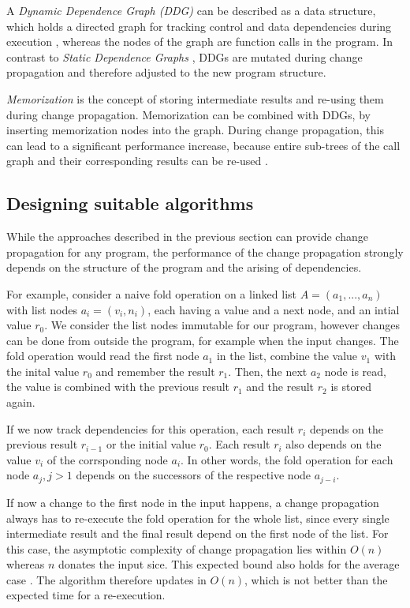 A \textit{Dynamic Dependence Graph (DDG)} can be described as a data structure, which holds a directed graph for tracking control and data dependencies during execution \cite{Acar2005thesis}, whereas the nodes of the graph are function calls in the program. In contrast to \textit{Static Dependence Graphs} \cite{Demers1981}, DDGs are mutated during change propagation and therefore adjusted to the new program structure. 

\textit{Memorization} is the concept of storing intermediate results and re-using them during change propagation. Memorization can be combined with DDGs, by inserting memorization nodes into the graph. During change propagation, this can lead to a significant performance increase, because entire sub-trees of the call graph and their corresponding results can be re-used \cite{Acar2005thesis}.

\subsection{Designing suitable algorithms}

While the approaches described in the previous section can provide change propagation for any program, the performance of the change propagation strongly depends on the structure of the program and the arising of dependencies. 

For example, consider a naive fold operation on a linked list $A = (a_1, ..., a_n)$ with list nodes $a_i = (v_i, n_i)$, each having a value and a next node, and an intial value $r_0$. We consider the list nodes immutable for our program, however changes can be done from outside the program, for example when the input changes. The fold operation would read the first node $a_1$ in the list, combine the value $v_1$ with the inital value $r_0$ and remember the result $r_1$. Then, the next $a_2$ node is read, the value is combined with the previous result $r_1$ and the result $r_2$ is stored again. 

If we now track dependencies for this operation, each result $r_i$ depends on the previous result $r_{i - 1}$ or the initial value $r_0$. Each result $r_i$ also depends on the value $v_i$ of the corrsponding node $a_i$. In other words, the fold operation for each node $a_j, j > 1$ depends on the successors of the respective node $a_{j - i}$.

If now a change to the first node in the input happens, a change propagation always has to re-execute the fold operation for the whole list, since every single intermediate result and the final result depend on the first node of the list. For this case, the asymptotic complexity of change propagation lies within $O(n)$ whereas $n$ donates the input sice. This expected bound also holds for the average case \cite{Acar2005thesis}. The algorithm therefore updates in $O(n)$, which is not better than the expected time for a re-execution. 

